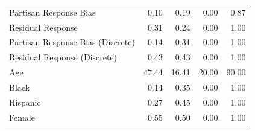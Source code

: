 \documentclass{article}\usepackage[]{graphicx}\usepackage[]{xcolor}
\begin{document}
\begin{table}[H]
\begin{minipage}[t]{0.48\linewidth}
{\begin{tabular}{lrrrr}
  Partisan Response Bias & 0.10 & 0.19 & 0.00 & 0.87 \\ 
  Residual Response & 0.31 & 0.24 & 0.00 & 1.00 \\ 
  Partisan Response Bias (Discrete) & 0.14 & 0.31 & 0.00 & 1.00 \\ 
  Residual Response (Discrete) & 0.43 & 0.43 & 0.00 & 1.00 \\ 
  Age & 47.44 & 16.41 & 20.00 & 90.00 \\ 
  Black & 0.14 & 0.35 & 0.00 & 1.00 \\ 
  Hispanic & 0.27 & 0.45 & 0.00 & 1.00 \\ 
  Female & 0.55 & 0.50 & 0.00 & 1.00 \\ 
   \hline
\end{tabular}
}
\end{minipage}
\end{table}
\end{document}
